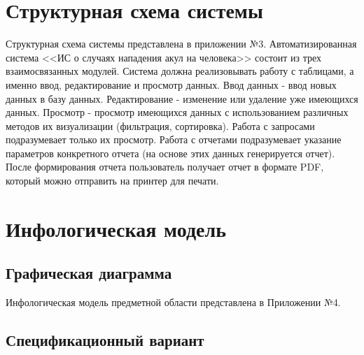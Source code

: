 \documentclass[russian,utf8,simple,emptystyle]{eskdtext}
\begin{document}
\section{Структурная схема системы}
Структурная схема системы представлена в приложении №3. Автоматизированная система <<ИС о случаях нападения акул на человека>> состоит из трех взаимосвязанных модулей. Система должна реализовывать работу с таблицами, а именно ввод, редактирование и просмотр данных. Ввод данных - ввод новых данных в базу данных. Редактирование - изменение или удаление уже имеющихся данных. Просмотр - просмотр имеющихся данных с использованием различных методов их визуализации (фильтрация, сортировка). Работа с запросами подразумевает только их просмотр.
Работа с отчетами подразумевает указание параметров конкретного отчета (на основе этих данных генерируется отчет). После формирования отчета пользователь получает отчет в формате PDF, который можно отправить на принтер для печати.

\clearpage
\section{Инфологическая модель}
\subsection{Графическая диаграмма}
Инфологическая модель предметной области представлена в Приложении №4.

\subsection{Спецификационный вариант}
\end{document}
